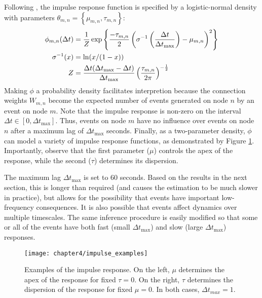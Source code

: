 		Following \cite{Linderman2015}, the impulse response function is specified by a logistic-normal density with parameters $\theta_{m , n} = \left \{ \mu_{m , n}, \tau_{m , n} \right \}$:
		\begin{align}
		\phi_{m, n}(\Delta t) &= \frac{1}{Z} \exp \left \{ \frac{-\tau_{m , n}}{2} \left( \sigma^{-1} \left( \frac{\Delta t}{\Delta t_{\text{max}}} \right) - \mu_{m , n} \right)^2  \right \} \notag \\
		\sigma^{-1}(x) &= \ln(x/(1-x)) \notag \\
		Z &= \frac{\Delta t (\Delta t_{\text{max}} - \Delta t)}{\Delta t_{\text{max}}} \left( \frac{\tau_{m , n}}{2 \pi} \right)^{-\frac{1}{2}}
		\end{align}
		Making $\phi$ a probability density facilitates interpretion because the connection weights $W_{m,n}$ become the expected number of events generated on node $n$ by an event on node $m$. Note that the impulse response is non-zero on the interval $\Delta t \in [0, \Delta t_{\text{max}}]$. Thus, events on node $m$ have no influence over events on node $n$ after a maximum lag of $\Delta t_{\text{max}}$ seconds. Finally, as a two-parameter density, $\phi$ can model a variety of impulse response functions, as demonstrated by Figure \ref{fig:impulse_examples}. Importantly, observe that the first parameter ($\mu$) controls the apex of the response, while the second ($\tau$) determines its dispersion.

		The maximum lag $\Delta t_{\text{max}}$ is set to 60 seconds. Based on the results in the next section, this is longer than required (and causes the estimation to be much slower in practice), but allows for the possibility that events have important low-frequency consequences. It is also possible that events affect dynamics over multiple timescales. The same inference procedure is easily modified so that some or all of the events have both fast (small $\Delta t_{\text{max}}$) and slow (large $\Delta t_{\text{max}}$) responses.

		\begin{figure}[t]
			\small
			\linespread{1}
			\centering
			\texttt{[image: chapter4/impulse\_examples]}
			\captionsetup{skip=-20pt, labelsep=colon, font=footnotesize, width=\linewidth}
			\caption[Examples of the impulse response]{Examples of the impulse response. On the left, $\mu$ determines the apex of the response for fixed $\tau=0$. On the right, $\tau$ determines the dispersion of the response for fixed $\mu=0$. In both cases, $\Delta t_{max} = 1$.}
			\label{fig:impulse_examples}
		\end{figure}

